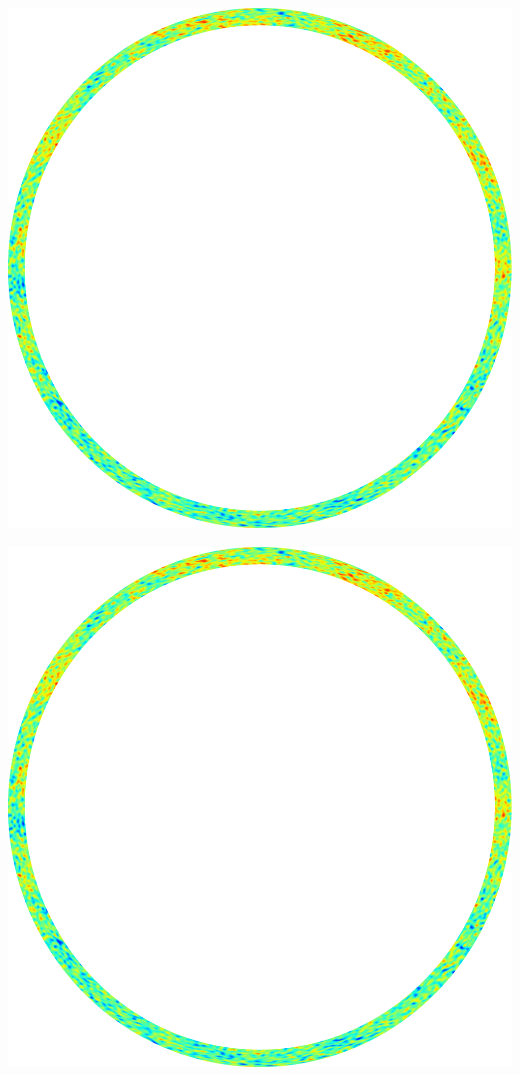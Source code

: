 \documentclass{beamer}
\begin{document}
\begin{frame}
    \begin{overprint}
        \begin{center}
            \includegraphics[height=\textheight]{figures/scalemap1}
        \end{center}
        \begin{center}
            \includegraphics[height=\textheight]{figures/scalemap3} %

\end{center}
\end{overprint}
\end{frame}
\end{document}
